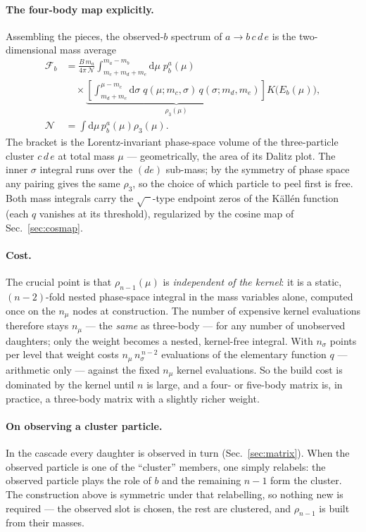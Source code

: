 \documentclass[11pt]{article}
\newcommand{\Fb}{\mathcal{F}_b}
\begin{document}
\paragraph{The four-body map explicitly.}
Assembling the pieces, the observed-$b$ spectrum of $a\to b\,c\,d\,e$ is the
two-dimensional mass average
\begin{equation}
\begin{aligned}
\Fb
&=\frac{B\,m_a}{4\pi\,\mathcal N}
\int_{m_c+m_d+m_e}^{m_a-m_b}\!\!\mathrm{d}\mu\;p^a_b(\mu)\\
&\quad{}\times
\underbrace{\left[\int_{m_d+m_e}^{\mu-m_c}\!\!\mathrm{d}\sigma\;
q(\mu;m_c,\sigma)\,q(\sigma;m_d,m_e)\right]}_{\rho_3(\mu)}
K\big(E_b(\mu)\big),\\
\mathcal N
&=\int\!\mathrm{d}\mu\,p^a_b(\mu)\rho_3(\mu).
\end{aligned}
\label{eq:fourbody}
\end{equation}
The bracket is the Lorentz-invariant phase-space volume of the
three-particle cluster $c\,d\,e$ at total mass $\mu$ --- geometrically, the
area of its Dalitz plot.  The inner $\sigma$ integral runs over the $(de)$
sub-mass; by the symmetry of phase space any pairing gives the same
$\rho_3$, so the choice of which particle to peel first is free.  Both mass
integrals carry the $\sqrt{\phantom{x}}$-type endpoint zeros of the Källén
function (each $q$ vanishes at its threshold), regularized by the cosine
map of Sec.~\ref{sec:cosmap}.

\paragraph{Cost.}
The crucial point is that $\rho_{n-1}(\mu)$ is \emph{independent of the
kernel}: it is a static, $(n-2)$-fold nested phase-space integral in the
mass variables alone, computed once on the $n_\mu$ nodes at construction.
The number of expensive kernel evaluations therefore stays $n_\mu$ ---
the \emph{same} as three-body --- for any number of unobserved daughters;
only the weight becomes a nested, kernel-free integral.  With $n_\sigma$
points per level that weight costs $n_\mu\,n_\sigma^{\,n-2}$ evaluations of
the elementary function $q$ --- arithmetic only --- against the fixed $n_\mu$
kernel evaluations.  So the build cost is dominated by the kernel until $n$
is large, and a four- or five-body matrix is, in practice, a three-body
matrix with a slightly richer weight.

\paragraph{On observing a cluster particle.}
In the cascade every daughter is observed in turn (Sec.~\ref{sec:matrix}).
When the observed particle is one of the ``cluster'' members, one simply
relabels: the observed particle plays the role of $b$ and the remaining
$n-1$ form the cluster.  The construction above is symmetric under that
relabelling, so nothing new is required --- the observed slot is chosen,
the rest are clustered, and $\rho_{n-1}$ is built from their masses.
\end{document}
